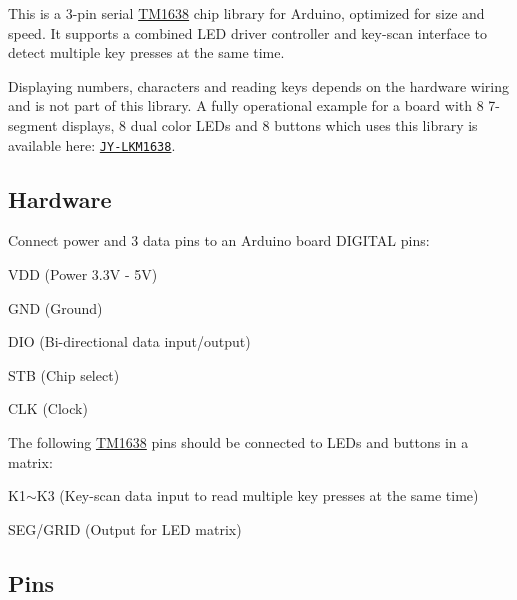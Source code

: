 \href{https://travis-ci.org/Erriez/ErriezTM1638}{\tt }

This is a 3-\/pin serial \hyperlink{class_t_m1638}{T\+M1638} chip library for Arduino, optimized for size and speed. It supports a combined L\+ED driver controller and key-\/scan interface to detect multiple key presses at the same time.



Displaying numbers, characters and reading keys depends on the hardware wiring and is not part of this library. A fully operational example for a board with 8 7-\/segment displays, 8 dual color L\+ED\textquotesingle{}s and 8 buttons which uses this library is available here\+: \href{https://github.com/Erriez/ErriezLKM1638}{\tt J\+Y-\/\+L\+K\+M1638}.

\subsection*{Hardware}

Connect power and 3 data pins to an Arduino board D\+I\+G\+I\+T\+AL pins\+:
\begin{DoxyItemize}
\item V\+DD (Power 3.\+3V -\/ 5V)
\item G\+ND (Ground)
\item D\+IO (Bi-\/directional data input/output)
\item S\+TB (Chip select)
\item C\+LK (Clock)
\end{DoxyItemize}

The following \hyperlink{class_t_m1638}{T\+M1638} pins should be connected to L\+ED\textquotesingle{}s and buttons in a matrix\+:
\begin{DoxyItemize}
\item K1$\sim$\+K3 (Key-\/scan data input to read multiple key presses at the same time)
\item S\+E\+G/\+G\+R\+ID (Output for L\+ED matrix)
\end{DoxyItemize}

\subsection*{Pins}

